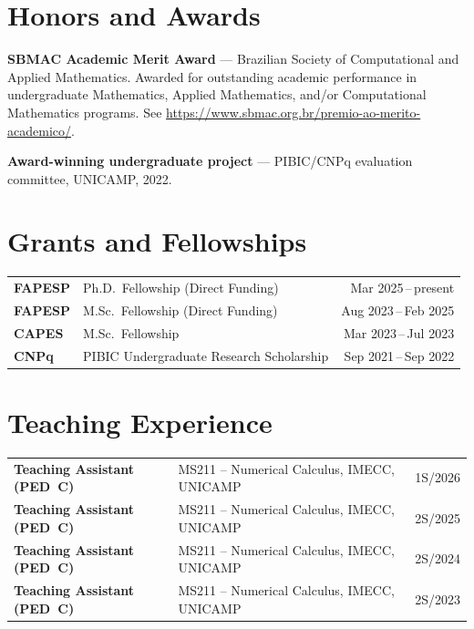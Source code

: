 \documentclass[11pt,a4paper]{article}
\begin{document}
\section{Honors and Awards}

\begin{enumerate}[leftmargin=1.5em, label={[\arabic*]}]
    \item \textbf{SBMAC Academic Merit Award} --- Brazilian Society of Computational and Applied Mathematics. Awarded for outstanding academic performance in undergraduate Mathematics, Applied Mathematics, and/or Computational Mathematics programs. See \url{https://www.sbmac.org.br/premio-ao-merito-academico/}.

    \item \textbf{Award-winning undergraduate project} --- PIBIC/CNPq evaluation committee, UNICAMP, 2022.
\end{enumerate}

\section{Grants and Fellowships}

\begin{tabularx}{\textwidth}{@{}lXr@{}}
    \textbf{FAPESP} & Ph.D.\ Fellowship (Direct Funding) & Mar 2025\,--\,present \\
    \textbf{FAPESP} & M.Sc.\ Fellowship (Direct Funding) & Aug 2023\,--\,Feb 2025 \\
    \textbf{CAPES} & M.Sc.\ Fellowship & Mar 2023\,--\,Jul 2023 \\
    \textbf{CNPq} & PIBIC Undergraduate Research Scholarship & Sep 2021\,--\,Sep 2022 \\
\end{tabularx}

\section{Teaching Experience}

\begin{tabularx}{\textwidth}{@{}lXr@{}}
    \textbf{Teaching Assistant (PED~C)} & MS211 -- Numerical Calculus, IMECC, UNICAMP & 1S/2026 \\
    \textbf{Teaching Assistant (PED~C)} & MS211 -- Numerical Calculus, IMECC, UNICAMP & 2S/2025 \\
    \textbf{Teaching Assistant (PED~C)} & MS211 -- Numerical Calculus, IMECC, UNICAMP & 2S/2024 \\
    \textbf{Teaching Assistant (PED~C)} & MS211 -- Numerical Calculus, IMECC, UNICAMP & 2S/2023 \\
\end{tabularx}
\end{document}
